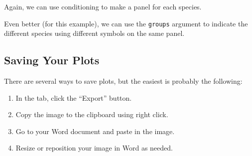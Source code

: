 Again, we can use conditioning to make a panel for each species.
\begin{knitrout}
\end{knitrout}



Even better (for this example), we can use the \verb!groups! argument to indicate the different species using
different symbols on the same panel.
\begin{knitrout}
\end{knitrout}


\subsection{Saving Your Plots}

There are several ways to save plots, but the easiest is probably the following:
\begin{enumerate}
\item
In the  tab, click the ``Export'' button.
\item
Copy the image to the clipboard using right click.
\item
Go to your Word document and paste in the image.
\item
Resize or reposition your image in Word as needed.
\end{enumerate}

